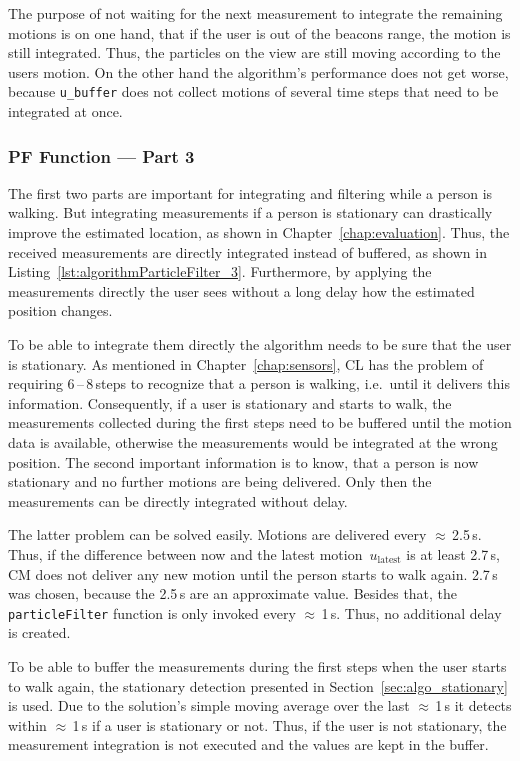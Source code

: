 The purpose of not waiting for the next measurement to integrate the remaining motions is on one hand, that if the user is out of the beacons range, the motion is still integrated. Thus, the particles on the view are still moving according to the users motion. On the other hand the algorithm's performance does not get worse, because \texttt{u\_buffer} does not collect motions of several time steps that need to be integrated at once.




\subsubsection*{\acl{PF} Function --- Part 3}
The first two parts are important for integrating and filtering while a person is walking. But integrating measurements if a person is stationary can drastically improve the estimated location, as shown in Chapter~\ref{chap:evaluation}. Thus, the received measurements are directly integrated instead of buffered, as shown in Listing~\ref{lst:algorithmParticleFilter_3}. Furthermore, by applying the measurements directly the user sees without a long delay how the estimated position changes.

To be able to integrate them directly the algorithm needs to be sure that the user is stationary. As mentioned in Chapter~\ref{chap:sensors}, \acs{CL} has the problem of requiring 6\,--\,8\,steps to recognize that a person is walking, i.e.\ until it delivers this information. Consequently, if a user is stationary and starts to walk, the measurements collected during the first steps need to be buffered until the motion data is available, otherwise the measurements would be integrated at the wrong position. The second important information is to know, that a person is now stationary and no further motions are being delivered. Only then the measurements can be directly integrated without delay.

The latter problem can be solved easily. Motions are delivered every $\approx$\,2.5\,s. Thus, if the difference between now and the latest motion~$u_\text{latest}$ is at least 2.7\,s, \acs{CM} does not deliver any new motion until the person starts to walk again. 2.7\,s was chosen, because the 2.5\,s are an approximate value. Besides that, the \texttt{particleFilter} function is only invoked every $\approx$\,1\,s. Thus, no additional delay is created.

To be able to buffer the measurements during the first steps when the user starts to walk again, the stationary detection presented in Section~\ref{sec:algo_stationary} is used. Due to the solution's simple moving average over the last $\approx$\,1\,s it detects within $\approx$\,1\,s if a user is stationary or not. Thus, if the user is not stationary, the measurement integration is not executed and the values are kept in the buffer.

